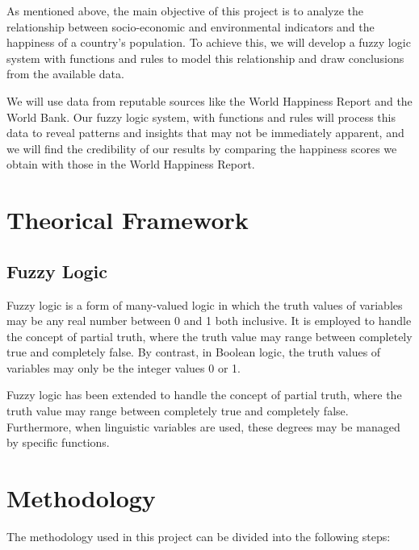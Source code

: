 \documentclass[fleqn,11pt]{article}
\begin{document}
As mentioned above, the main objective of this project is to analyze the relationship between socio-economic and environmental indicators and the happiness of a country's population. To achieve this, we will develop a fuzzy logic system with functions and rules to model this relationship and draw conclusions from the available data.

We will use data from reputable sources like the World Happiness Report and the World Bank. Our fuzzy logic system, with functions and rules will process this data to reveal patterns and insights that may not be immediately apparent, and we will find the credibility of our results by comparing the happiness scores we obtain with those in the World Happiness Report.


\section{Theorical Framework}

\subsection{Fuzzy Logic}
Fuzzy logic is a form of many-valued logic in which the truth values of variables may be any real number between 0 and 1 both inclusive. It is employed to handle the concept of partial truth, where the truth value may range between completely true and completely false. By contrast, in Boolean logic, the truth values of variables may only be the integer values 0 or 1.

Fuzzy logic has been extended to handle the concept of partial truth, where the truth value may range between completely true and completely false. Furthermore, when linguistic variables are used, these degrees may be managed by specific functions.

\section{Methodology}

The methodology used in this project can be divided into the following steps:
\end{document}
